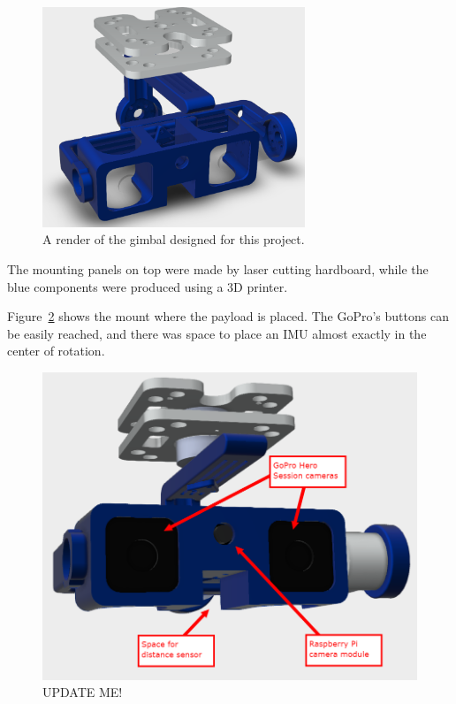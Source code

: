 \begin{figure}[h!]
  \centering
  \includegraphics[width=0.7\textwidth]{methodology/assembled_render_no_cameras_motors}
  \caption{\label{fig:assembled_render} A render of the gimbal designed for this project.}
\end{figure}

The mounting panels on top were made by laser cutting hardboard, while the blue components were produced using a 3D printer.

Figure~\ref{fig:annotated_assembly_with_cams} shows the mount where the payload is placed. The GoPro's buttons can be easily reached, and there was space to place an IMU almost exactly in the center of rotation.

\begin{figure}[h!]
    \centering
    \includegraphics[width=0.7\linewidth]{methodology/annotated_assembly_with_cams}
    \caption{\label{fig:annotated_assembly_with_cams}UPDATE ME!}
\end{figure}

